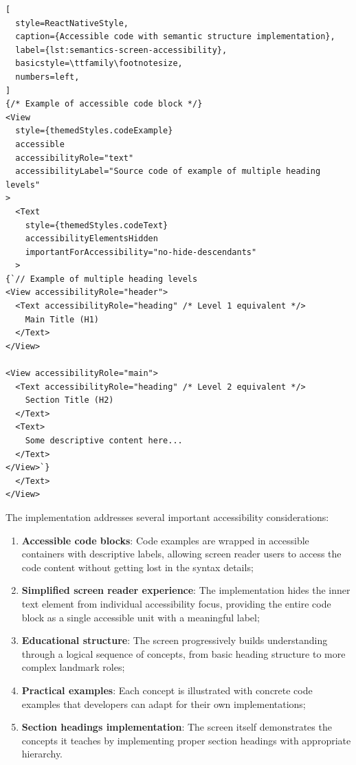 \begin{lstlisting}[
  style=ReactNativeStyle,
  caption={Accessible code with semantic structure implementation},
  label={lst:semantics-screen-accessibility},
  basicstyle=\ttfamily\footnotesize,
  numbers=left,
]
{/* Example of accessible code block */}
<View
  style={themedStyles.codeExample}
  accessible
  accessibilityRole="text"
  accessibilityLabel="Source code of example of multiple heading levels"
>
  <Text
    style={themedStyles.codeText}
    accessibilityElementsHidden
    importantForAccessibility="no-hide-descendants"
  >
{`// Example of multiple heading levels
<View accessibilityRole="header">
  <Text accessibilityRole="heading" /* Level 1 equivalent */>
    Main Title (H1)
  </Text>
</View>

<View accessibilityRole="main">
  <Text accessibilityRole="heading" /* Level 2 equivalent */>
    Section Title (H2)
  </Text>
  <Text>
    Some descriptive content here...
  </Text>
</View>`}
  </Text>
</View>
\end{lstlisting}
\FloatBarrier

The implementation addresses several important accessibility considerations:

\begin{enumerate}
    \item \textbf{Accessible code blocks}: Code examples are wrapped in accessible containers with descriptive labels, allowing screen reader users to access the code content without getting lost in the syntax details;
    
    \item \textbf{Simplified screen reader experience}: The implementation hides the inner text element from individual accessibility focus, providing the entire code block as a single accessible unit with a meaningful label;
    
    \item \textbf{Educational structure}: The screen progressively builds understanding through a logical sequence of concepts, from basic heading structure to more complex landmark roles;
    
    \item \textbf{Practical examples}: Each concept is illustrated with concrete code examples that developers can adapt for their own implementations;
    
    \item \textbf{Section headings implementation}: The screen itself demonstrates the concepts it teaches by implementing proper section headings with appropriate hierarchy.
\end{enumerate}

